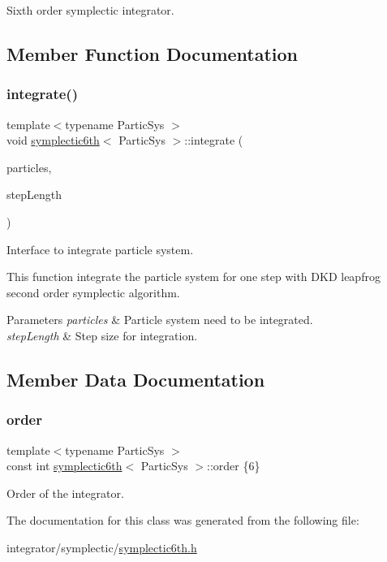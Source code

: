Sixth order symplectic integrator. 

\subsection{Member Function Documentation}
\mbox{\label{classsymplectic6th_a204014a9214f444e23a1a75cbbae2b86}} 
\subsubsection{\texorpdfstring{integrate()}{integrate()}}
{\footnotesize\ttfamily template$<$typename Partic\+Sys $>$ \\
void \mbox{\hyperlink{classsymplectic6th}{symplectic6th}}$<$ Partic\+Sys $>$\+::integrate (\begin{DoxyParamCaption}\item[{Partic\+Sys \&}]{particles,  }\item[{double}]{step\+Length }\end{DoxyParamCaption})\hspace{0.3cm}{\ttfamily [private]}}



Interface to integrate particle system. 

This function integrate the particle system for one step with D\+KD leapfrog second order symplectic algorithm. 
\begin{DoxyParams}{Parameters}
{\em particles} & Particle system need to be integrated. \\
\hline
{\em step\+Length} & Step size for integration. \\
\hline
\end{DoxyParams}


\subsection{Member Data Documentation}
\mbox{\label{classsymplectic6th_a7f4232a8639d27aeb0890476176e8553}} 
\subsubsection{\texorpdfstring{order}{order}}
{\footnotesize\ttfamily template$<$typename Partic\+Sys $>$ \\
const int \mbox{\hyperlink{classsymplectic6th}{symplectic6th}}$<$ Partic\+Sys $>$\+::order \{6\}\hspace{0.3cm}{\ttfamily [static]}}



Order of the integrator. 



The documentation for this class was generated from the following file\+:\begin{DoxyCompactItemize}
\item 
integrator/symplectic/\mbox{\hyperlink{symplectic6th_8h}{symplectic6th.\+h}}\end{DoxyCompactItemize}
